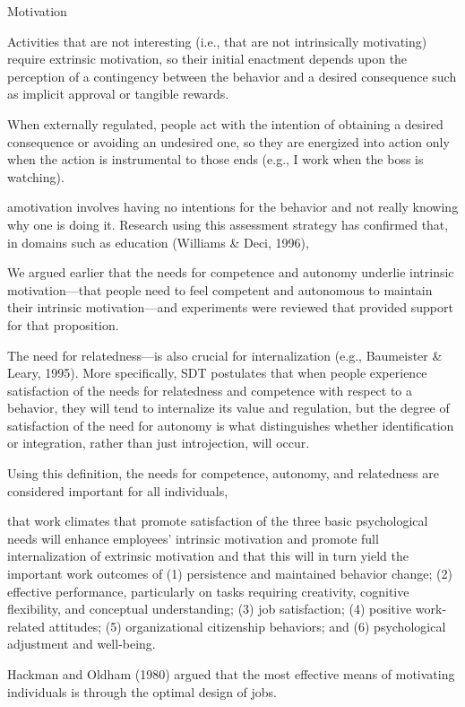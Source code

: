 Motivation

Activities that are not interesting (i.e., that are not intrinsically motivating) require extrinsic motivation, so their initial enactment depends upon the perception of a contingency between the behavior and a desired consequence such as implicit approval or tangible rewards.

When externally regulated, people act with the intention of obtaining a desired consequence or avoiding an undesired one, so they are energized into action only when the action is instrumental to those ends (e.g., I work when the boss is watching).

amotivation involves having no intentions for the behavior and not really knowing why one is doing it. Research using this assessment strategy has conﬁrmed that, in domains such as education (Williams & Deci, 1996),

We argued earlier that the needs for competence and autonomy underlie intrinsic motivation—that people need to feel competent and autonomous to maintain their intrinsic motivation—and experiments were reviewed that provided support for that proposition.

The need for relatedness—is also crucial for internalization (e.g., Baumeister & Leary, 1995). More speciﬁcally, SDT postulates that when people experience satisfaction of the needs for relatedness and competence with respect to a behavior, they will tend to internalize its value and regulation, but the degree of satisfaction of the need for autonomy is what distinguishes whether identiﬁcation or integration, rather than just introjection, will occur.

Using this deﬁnition, the needs for competence, autonomy, and relatedness are considered important for all individuals,

that work climates that promote satisfaction of the three basic psychological needs will enhance employees’ intrinsic motivation and promote full internalization of extrinsic motivation and that this will in turn yield the important work outcomes of (1) persistence and maintained behavior change; (2) effective performance, particularly on tasks requiring creativity, cognitive ﬂexibility, and conceptual understanding; (3) job satisfaction; (4) positive work-related attitudes; (5) organizational citizenship behaviors; and (6) psychological adjustment and well-being.


Hackman and Oldham (1980) argued that the most effective means of motivating individuals is through the optimal design of jobs.

